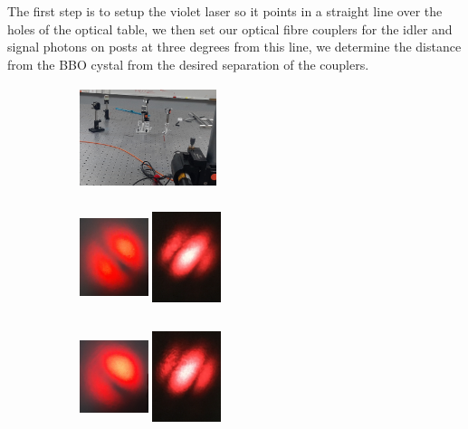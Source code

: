 \documentclass[12pt]{book}
\begin{document}
The first step is to setup the violet laser so it points in a straight line over the holes of the optical table, we then set our optical fibre couplers for the idler and signal photons on posts at three degrees from this line, we determine the distance from the BBO cystal from the desired separation of the couplers.

\begin{figure}[t!]
\centering
\begin{subfigure}[b]{0.3\linewidth}
\centering
\includegraphics[width=4cm,height=3cm]{images/array1.jpg}
\caption{}
\end{subfigure}
\begin{subfigure}[b]{0.3\linewidth}
\centering
\includegraphics[width=2cm,height=3cm]{images/fotos/11.jpg}
\includegraphics[width=2cm,height=3cm]{images/fotos/112.jpg}
\caption{}
\end{subfigure}
\begin{subfigure}[b]{0.3\linewidth}
\centering
\includegraphics[width=2cm,height=3cm]{images/fotos/21.jpg}
\includegraphics[width=2cm,height=3cm]{images/fotos/102.jpg}

\end{subfigure}
\end{figure}
\end{document}
